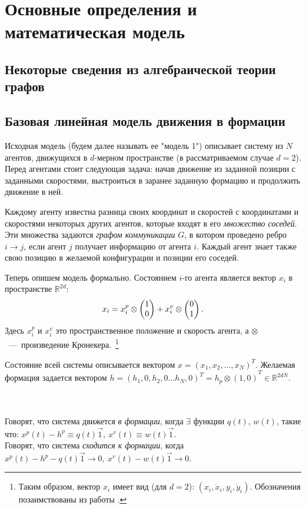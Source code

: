 \chapter{Основные определения и математическая модель} \label{definitions}

\section{Некоторые сведения из алгебраической теории графов}

\section{Базовая линейная модель движения в формации}
Исходная модель (будем далее называть ее "модель 1") описывает систему из $N$ агентов, движущихся в $d$-мерном пространстве (в рассматриваемом случае $d=2$). Перед агентами стоит следующая задача: начав движение из заданной позиции с заданными скоростями, выстроиться в заранее заданную формацию и продолжить движение в ней. 

Каждому агенту известна разница своих координат и скоростей с координатами и скоростями некоторых других агентов, которые входят в его \emph{множество соседей}. Эти множества задаются \emph{графом коммуникации} $G$, в котором проведено ребро $i\rightarrow j$, если агент $j$ получает информацию от агента $i$. Каждый агент знает также свою позицию в желаемой конфигурации и позиции его соседей.

Теперь опишем модель формально.
Состоянием $i$-го агента является  вектор $x_i$
в пространстве $\mathbb{R}^{2d}$:
$$x_i=x^p_i\otimes\veccol{1;0}+x^v_i\otimes
\veccol{0;1}.$$
Здесь $x^p_i$ и $x^v_i$ это пространственное положение и скорость агента, а $\otimes$\ ---\ произведение Кронекера.~\footnote{Таким образом, вектор $x_i$ имеет вид (для $d=2$): $\left(x_i, \dot{x}_i, y_i, \dot{y}_i\right)$. Обозначения позаимствованы из работы \cite{veerman2005flocks}.}

Состояние всей системы описывается вектором $x=\left(x_1,x_2,\ldots,x_N\right)^T$. Желаемая формация задается вектором 
$h={\left(h_1,0,h_2,0\ldots h_N,0\right)^T=h_p\otimes\left(1,0\right)}^T\in\mathbb{R}^{2dN}$.

\begin{definition}
\\\\
Говорят, что система движется \emph{в формации}, когда $\exists$ функции $q(t)$, $w(t)$, такие что:
$
x^p(t)-h^p\equiv q(t)\vec{1},\ x^v(t)\equiv w(t)\vec{1}.
$
\\
Говорят, что система \emph{сходится к формации}, когда
$
x^p(t)-h^p-q(t)\vec{1}\rightarrow 0,\ x^v(t)-w(t)\vec{1}\rightarrow 0.
$
\end{definition}

